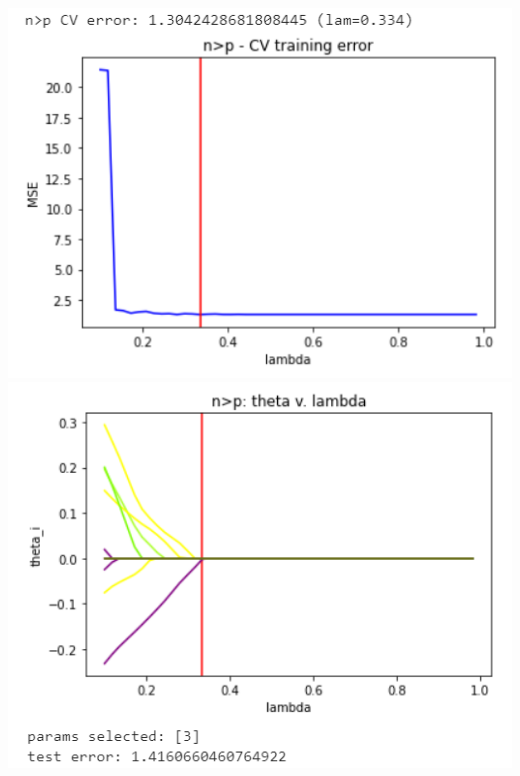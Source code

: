 \documentclass[11pt]{article}
\begin{document}
\begin{center}
\includegraphics[scale=0.7]{charts/lasso_corr_n_gt_p_err.PNG}
\includegraphics[scale=0.7]{charts/lasso_corr_n_gt_p_thetas.PNG}


\end{center}
\end{document}
